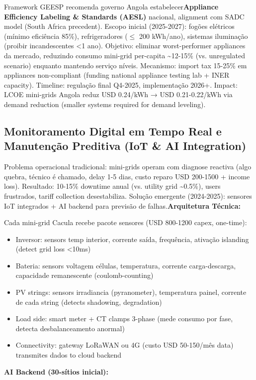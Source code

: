 \documentclass[12pt, a4paper]{article}
\begin{document}
Framework GEESP recomenda governo Angola estabelecer\textbf{Appliance Efficiency Labeling \& Standards (AESL)} nacional, alignment com SADC model (South Africa precedent). Escopo inicial (2025-2027): fogões elétricos (mínimo eficiência 85\%), refrigeradores ($\leq$ 200 kWh/ano), sistemas iluminação (proibir incandescentes <1 ano). Objetivo: eliminar worst-performer appliances da mercado, reduzindo consumo mini-grid per-capita \textasciitilde{}12-15\% (vs. unregulated scenario) enquanto mantendo serviço níveis. Mecanismo: import tax 15-25\% em appliances non-compliant (funding national appliance testing lab + INER capacity). Timeline: regulação final Q4-2025, implementação 2026+. Impact: LCOE mini-grids Angola reduz USD 0.24/kWh → USD 0.21-0.22/kWh via demand reduction (smaller systems required for demand leveling).

\subsection{Monitoramento Digital em Tempo Real e Manutenção Preditiva (IoT \& AI Integration)}

Problema operacional tradicional: mini-grids operam com diagnose reactiva (algo quebra, técnico é chamado, delay 1-5 dias, custo reparo USD 200-1500 + income loss). Resultado: 10-15\% downtime anual (vs. utility grid \textasciitilde{}0.5\%), users frustrados, tariff collection desestabiliza. Solução emergente (2024-2025): sensores IoT integrados + AI backend para previsão de falhas.\textbf{Arquitetura Técnica:}

Cada mini-grid Cacula recebe pacote sensores (USD 800-1200 capex, one-time):
\begin{itemize}
\item Inversor: sensors temp interior, corrente saída, frequência, ativação islanding (detect grid loss <10ms)
\item Bateria: sensors voltagem células, temperatura, corrente carga-descarga, capacidade remanescente (coulomb-counting)
\item PV strings: sensors irradiancia (pyranometer), temperatura painel, corrente de cada string (detects shadowing, degradation)
\item Load side: smart meter + CT clamps 3-phase (mede consumo por fase, detecta desbalanceamento anormal)
\item Connectivity: gateway LoRaWAN ou 4G (custo USD 50-150/mês data) transmites dados to cloud backend
\end{itemize}\textbf{AI Backend (30-sítios inicial):}
\end{document}
